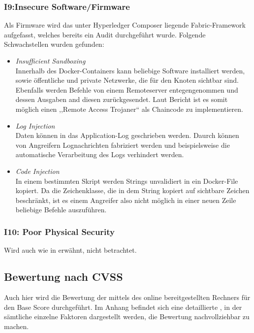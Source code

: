         \subsubsection*{I9:Insecure Software/Firmware}
            Als Firmware wird das unter Hyperledger Composer liegende Fabric-Framework aufgefasst, welches bereits ein Audit\cite{Shaw2017} durchgeführt wurde. 
            Folgende Schwachstellen wurden gefunden:
            \begin{itemize}[leftmargin=0cm,label={}]
    	        \item \emph{Insufficient Sandboxing}\cite{Shaw2017}\label{vuln:fabric_sandbox}\\
    	            Innerhalb des Docker-Containers kann beliebige Software installiert werden, sowie öffentliche und private Netzwerke, die für den Knoten sichtbar sind. 
    	            Ebenfalls werden Befehle von einem Remoteserver entegengenommen und dessen Ausgaben and diesen zurückgesendet. 
    	            Laut Bericht ist es somit möglich einen ,,Remote Access Trojaner`` als Chaincode zu implementieren.
    	        \item \emph{Log Injection}\cite{Shaw2017}\label{vuln:fabric_log_injection}\\
    	            Daten können in das Application-Log geschrieben werden.
    	            Daurch können von Angreifern Lognachrichten fabriziert werden und beispielsweise die automatische Verarbeitung des Logs verhindert werden. 
    	        \item \emph{Code Injection}\cite{Shaw2017}\label{vuln:fabric_code_injection}\\
    	            In einem bestimmten Skript werden Strings unvalidiert in ein Docker-File kopiert. 
    	            Da die Zeichenklasse, die in dem String kopiert auf sichtbare Zeichen beschränkt, ist es einem Angreifer also nicht möglich in einer neuen Zeile beliebige Befehle auszuführen.
            \end{itemize}
            
        \subsubsection*{I10: Poor Physical Security}
            Wird auch wie in  erwähnt, nicht betrachtet.
    
    \subsection{Bewertung nach CVSS}
    \label{sec:evaluation_cvss}
        Auch hier wird die Bewertung der  mittels des online bereitgestellten Rechners\cite{CvssCalc} für den Base Score durchgeführt. 
    	Im Anhang befindet sich eine detaillierte , in der sämtliche einzelne Faktoren dargestellt werden, die Bewertung nachvollziehbar zu machen.
    
